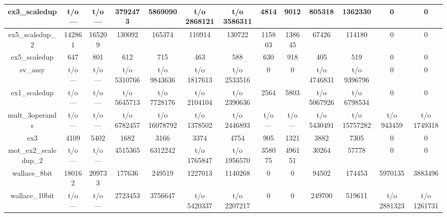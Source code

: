 \begin{sidewaystable}[t]
\begin{tabular}{|c|c|c|c|c|c|c|c|c|c|c|c|c|}
ex3\_scaledup         & t/o ---        & t/o ---       & 3792473         & 5869090         & t/o 2868121    & t/o 3586311    & 4814           & 9012          & 805318          & 1362330         & 0              & 0              \\ \hline
ex5\_scaledup\_2      & 142861         & 165209        & 130092          & 165374          & 110914         & 130722         & 115803         & 138645        & 67426           & 114180          & 0              & 0              \\ \hline
ex5\_scaledup         & 647            & 801           & 612             & 715             & 463            & 588            & 630            & 918           & 405             & 519             & 0              & 0              \\ \hline
sv\_assy              & t/o ---        & t/o ---       & t/o 5310766     & t/o 9843636     & t/o 1817613    & t/o 2533516    & 0              & 0             & t/o 4746831     & t/o 9396796     & 0              & 0              \\ \hline
ex1\_scaledup         & t/o ---        & t/o ---       & t/o 5645713     & t/o 7728176     & t/o 2104104    & t/o 2390636    & 2564           & 5803          & t/o 5067926     & t/o 6798534     & 0              & 0              \\ \hline
mult\_3operands       & t/o ---        & t/o ---       & t/o 6782457     & t/o 16078792    & t/o 1378502    & t/o 2446893    & t/o ---        & t/o ---       & t/o 5430491     & t/o 15757282    & t/o 943459     & t/o 1749318    \\ \hline
ex3                   & 4109           & 5402          & 1682            & 3166            & 3374           & 4754           & 905            & 1321          & 3882            & 7305            & 0              & 0              \\ \hline
mot\_ex2\_scaledup\_2 & t/o ---        & t/o ---       & 4515365         & 6312242         & t/o 1765847    & t/o 1956570    & 358075         & 496151        & 30264           & 57778           & 0              & 0              \\ \hline
wallace\_8bit  & 180162         & 209733        & 177636          & 249519          & 1227013        & 1140268        & 0              & 0             & 94502           & 174453          & 5970135        & 3883496        \\ \hline
wallace\_10bit & t/o ---        & t/o ---       & 2723453         & 3756647         & t/o 5420337    & t/o 2207217    & 0              & 0             & 249700          & 519611          & t/o 2881323    & t/o 1261731    \\ \hline

\end{tabular}
\end{sidewaystable}
